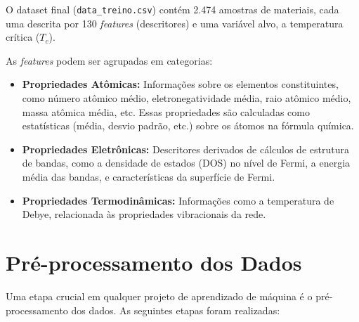 \documentclass[12pt, a4paper, oneside]{report}
\begin{document}
O dataset final (\texttt{data\_treino.csv}) contém 2.474 amostras de materiais, cada uma descrita por 130 \textit{features} (descritores) e uma variável alvo, a temperatura crítica ($T_c$).

As \textit{features} podem ser agrupadas em categorias:
\begin{itemize}
    \item \textbf{Propriedades Atômicas:} Informações sobre os elementos constituintes, como número atômico médio, eletronegatividade média, raio atômico médio, massa atômica média, etc. Essas propriedades são calculadas como estatísticas (média, desvio padrão, etc.) sobre os átomos na fórmula química.
    \item \textbf{Propriedades Eletrônicas:} Descritores derivados de cálculos de estrutura de bandas, como a densidade de estados (DOS) no nível de Fermi, a energia média das bandas, e características da superfície de Fermi.
    \item \textbf{Propriedades Termodinâmicas:} Informações como a temperatura de Debye, relacionada às propriedades vibracionais da rede.
\end{itemize}

\section{Pré-processamento dos Dados}

Uma etapa crucial em qualquer projeto de aprendizado de máquina é o pré-processamento dos dados. As seguintes etapas foram realizadas:
\end{document}
